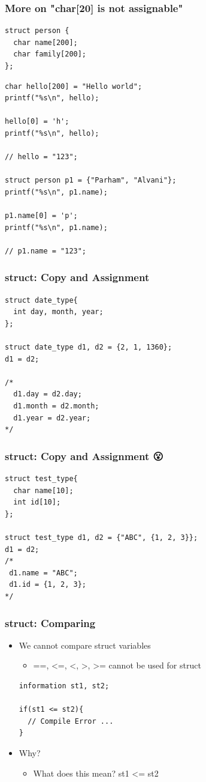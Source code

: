 \documentclass{../c-lecture}
\begin{document}
\begin{frame}[fragile]
  \frametitle{More on "char[20] is not assignable"}
  \begin{verbatim}
struct person {
  char name[200];
  char family[200];
};
  \end{verbatim}
  \begin{verbatim}
char hello[200] = "Hello world";
printf("%s\n", hello);

hello[0] = 'h';
printf("%s\n", hello);

// hello = "123";

struct person p1 = {"Parham", "Alvani"};
printf("%s\n", p1.name);

p1.name[0] = 'p';
printf("%s\n", p1.name);

// p1.name = "123";
  \end{verbatim}
\end{frame}

\begin{frame}[fragile]
  \frametitle{struct: Copy and Assignment}
  \begin{verbatim}
struct date_type{
  int day, month, year;
};

struct date_type d1, d2 = {2, 1, 1360};
d1 = d2;

/*
  d1.day = d2.day;
  d1.month = d2.month;
  d1.year = d2.year;
*/
  \end{verbatim}
\end{frame}

\begin{frame}[fragile]
  \frametitle{struct: Copy and Assignment 😮}
  \begin{verbatim}
struct test_type{
  char name[10];
  int id[10];
};

struct test_type d1, d2 = {"ABC", {1, 2, 3}};
d1 = d2;
/*
 d1.name = "ABC";
 d1.id = {1, 2, 3};
*/

  \end{verbatim}
\end{frame}

\begin{frame}[fragile]
  \frametitle{struct: Comparing}
  \begin{itemize}
    \item
      We cannot compare struct variables
    \begin{itemize}
      \item ==, <=, <, >, >= cannot be used for struct
    \end{itemize}
    \begin{verbatim}
information st1, st2;

if(st1 <= st2){
  // Compile Error ...
}

    \end{verbatim}
    \item Why?
    \begin{itemize}
      \item What does this mean? st1 <= st2
    \end{itemize}
  \end{itemize}
\end{frame}
\end{document}
